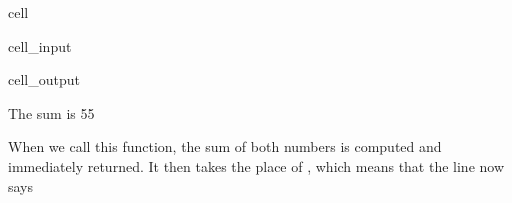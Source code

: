 \documentclass[letterpaper,10pt,english]{jupyterBook}
\begin{document}
\begin{sphinxuseclass}{cell}\begin{sphinxVerbatimInput}

\begin{sphinxuseclass}{cell_input}
\begin{sphinxVerbatim}[commandchars=\\\{\}]
  
       

          
      
\end{sphinxVerbatim}

\end{sphinxuseclass}\end{sphinxVerbatimInput}
\begin{sphinxVerbatimOutput}

\begin{sphinxuseclass}{cell_output}
\begin{sphinxVerbatim}[commandchars=\\\{\}]
The sum is 55
\end{sphinxVerbatim}

\end{sphinxuseclass}\end{sphinxVerbatimOutput}

\end{sphinxuseclass}
\sphinxAtStartPar
When we call this function, the sum of both numbers is computed and immediately returned. It then takes the place of , which means that the line now says

\begin{sphinxVerbatim}[commandchars=\\\{\}]
  
\end{sphinxVerbatim}
\end{document}
